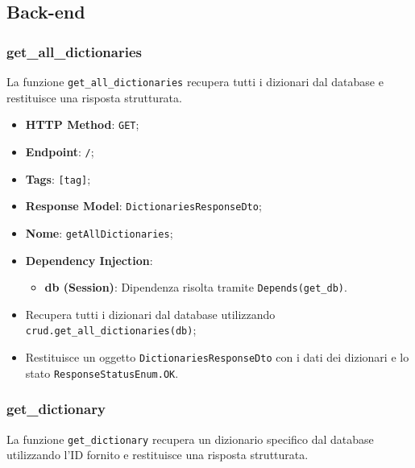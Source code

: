 \subsection{Back-end}


\subsubsection{get\_all\_dictionaries}

\par La funzione \texttt{get\_all\_dictionaries} recupera tutti i dizionari dal database e restituisce una risposta strutturata.

\begin{itemize}
\item \textbf{HTTP Method}: \texttt{GET};
\item \textbf{Endpoint}: \texttt{/};
\item \textbf{Tags}: \texttt{[tag]};
\item \textbf{Response Model}: \texttt{DictionariesResponseDto};
\item \textbf{Nome}: \texttt{getAllDictionaries};
\item \textbf{Dependency Injection}:
\begin{itemize}
\item \textbf{db (Session)}: Dipendenza risolta tramite \texttt{Depends(get\_db)}.
\end{itemize}
\end{itemize}

\begin{itemize}
\item Recupera tutti i dizionari dal database utilizzando \texttt{crud.get\_all\_dictionaries(db)};
\item Restituisce un oggetto \texttt{DictionariesResponseDto} con i dati dei dizionari e lo stato \texttt{ResponseStatusEnum.OK}.
\end{itemize}

\subsubsection{get\_dictionary}

\par La funzione \texttt{get\_dictionary} recupera un dizionario specifico dal database utilizzando l'ID fornito e restituisce una risposta strutturata.

